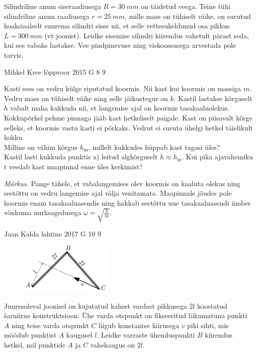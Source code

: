 \documentclass[11pt, twoside]{article}
\begin{document}
{{Silindriline anum siseraadiusega $R = \SI{30}{mm}$ on täidetud veega. Teine tühi silindriline anum raadiusega $r =\SI{25}{mm}$, mille mass on tühiselt väike, on surutud koaksiaalselt suurema silindri sisse nii, et selle vettesukeldunud osa pikkus $L = \SI{300}{mm}$ (vt joonist). Leidke sisemise silindri kiirendus vahetult pärast seda, kui see vabaks lastakse. Vee pindpinevuse ning viskoossusega arvestada pole tarvis.
\fi
}

{Mihkel Kree} %
{lõppvoor} %
{2015} %
{G 8} %
{9} %
{
\ifStatement
Kasti sees on vedru külge riputatud koormis. Nii kast kui koormis on massiga $m$. Vedru mass on tühiselt väike ning selle jäikustegur on $k$. Kastil lastakse kõrguselt $h$ vabalt maha kukkuda nii, et langemise ajal on koormis tasakaaluolekus. Kokkupõrkel pehme pinnaga jääb kast hetkeliselt paigale. Kast on piisavalt kõrge selleks, et koormis vastu kasti ei põrkaks. Vedrut ei suruta ühelgi hetkel täielikult kokku.\\
\osa Milline on vähim kõrgus $h_\text{m}$, millelt kukkudes hüppab kast tagasi üles?\\
\osa Kastil lasti kukkuda punktis a) leitud algkõrguselt $h\approx h_\text{m}$. Kui pika ajavahemiku $t$ veedab kast maapinnal enne üles kerkimist? 

\emph{Märkus.} Pange tähele, et vabalangemises olev koormis on kaaluta olekus ning seetõttu on vedru langemise ajal välja venitamata. Maapinnale jõudes pole koormis enam tasakaaluasendis ning hakkab seetõttu uue tasakaaluasendi ümber võnkuma nurksagedusega $\omega =\sqrt{\frac{k}{m}}$.
\fi
}

{Jaan Kalda} %
{lahtine} %
{2017} %
{G 10} %
{9} %
{
\ifStatement
\begin{figure}
	\vspace{-10pt}
	\includegraphics[width = 0.4\textwidth] {2017-lahg-10-delta.pdf}
\end{figure}

Juuresoleval joonisel on kujutatud kahest vardast pikkusega $2l$ koostatud \v sarniirne konstruktsioon. Ühe varda otspunkt on fikseeritud liikumatuna punkti $A$ ning teise varda otspunkt $C$ liigub konstantse kiirusega $v$ piki sihti, mis möödub punktist $A$ kaugusel $l$. Leidke varraste ühenduspunkti $B$ kiirendus hetkel, mil punktide $A$ ja $C$ vahekaugus on $2l$.
\fi
}
\newpage\subsection{\protect{}}

}
\end{document}
